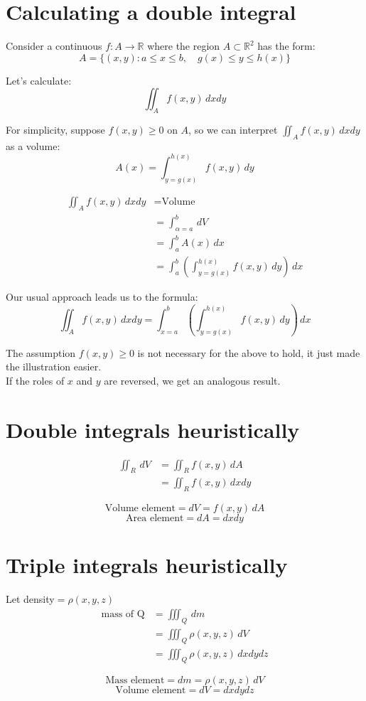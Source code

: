 \documentclass[11pt]{article}
\begin{document}
\newpage

\section{Calculating a double integral}
\label{sec:orgc218833}
Consider a continuous \(f : A \rightarrow \mathbb{R}\) where the region \(A \subset \mathbb{R}^2\) has the form:
\[A = \{(x, y) : a \le x \le b, \quad g(x) \le y \le h(x)\}\]

Let's calculate:
\[\iint_A f(x, y) \, dx dy\]

For simplicity, suppose \(f(x, y) \ge 0\) on \(A\), so we can interpret \(\iint_A f(x, y) \, dx dy\) as a volume:
\[A(x) = \int_{y = g(x)}^{h(x)} f(x, y) \, dy\]

\begin{align*}
\iint_A f(x, y) \, dx dy &= \text{Volume} \\
&= \int_{\alpha = a}^b \, dV \\
&= \int_a^b A(x) \, dx \\
&= \int_a^b \left( \int_{y = g(x)}^{h(x)} f(x, y) \, dy \right) \, dx
\end{align*}

Our usual approach leads us to the formula:
\[\iint_A f(x, y) \, dx dy = \int_{x = a}^b \left( \int_{y = g(x)}^{h(x)} f(x, y) \, dy \right) \, dx\]

The assumption \(f(x, y) \ge 0\) is not necessary for the above to hold, it just made the illustration easier.
\\[0pt]

If the roles of \(x\) and \(y\) are reversed, we get an analogous result.

\newpage

\section{Double integrals heuristically}
\label{sec:org84bcf03}
\begin{align*}
\iint_R \, dV &= \iint_R f(x, y) \, dA \\
&= \iint_R f(x, y) \, dx dy
\end{align*}

\[\text{Volume element} = dV = f(x, y) \, dA\]
\[\text{Area element} = dA = dx dy\]

\section{Triple integrals heuristically}
\label{sec:orgca511be}
Let density\(= \rho (x, y, z)\)
\begin{align*}
\text{mass of Q} &= \iiint_Q \, dm \\
&= \iiint_Q \rho (x, y, z) \, dV \\
&= \iiint_Q \rho (x, y, z) \, dx dy dz
\end{align*}

\[\text{Mass element} = dm = \rho (x, y, z) \, dV\]
\[\text{Volume element} = dV = dx dy dz\]
\end{document}
